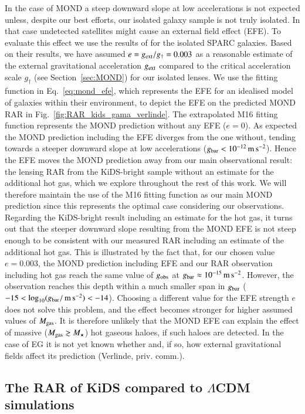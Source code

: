 \documentclass{aa}
\newcommand{\mpss}{\,{\rm m}\,{\rm s}^{-2} }
\newcommand{\un}[1]{_{\rm #1}}
\begin{document}
In the case of MOND a steep downward slope at low accelerations is not expected unless, despite our best efforts, our isolated galaxy sample is not truly isolated. In that case undetected satellites might cause an external field effect (EFE). To evaluate this effect we use the results of \cite{chae2020} for the isolated SPARC galaxies. Based on their results, we have assumed $e = g\un{ext}/g_\dagger = 0.003$ as a reasonable estimate of the external gravitational acceleration $g\un{ext}$ compared to the critical acceleration scale $g_\dagger$ (see Section~\ref{sec:MOND}) for our isolated lenses. We use the fitting function in Eq.~\ref{eq:mond_efe}, which represents the EFE for an idealised model of galaxies within their environment, to depict the EFE on the predicted MOND RAR in Fig.~\ref{fig:RAR_kids_gama_verlinde}. The extrapolated M16 fitting function represents the MOND prediction without any EFE ($e=0$). As expected the MOND prediction including the EFE diverges from the one without, tending towards a steeper downward slope at low accelerations ($g\un{bar} < 10^{-12} \mpss$). Hence the EFE moves the MOND prediction away from our main observational result: the lensing RAR from the KiDS-bright sample without an estimate for the additional hot gas, which we explore throughout the rest of this work. We will therefore maintain the use of the M16 fitting function as our main MOND prediction since this represents the optimal case considering our observations. Regarding the KiDS-bright result including an estimate for the hot gas, it turns out that the steeper downward slope resulting from the MOND EFE is not steep enough to be consistent with our measured RAR including an estimate of the additional hot gas. This is illustrated by the fact that, for our chosen value $e=0.003$, the MOND prediction including EFE and our RAR observation including hot gas reach the same value of $g\un{obs}$ at $g\un{bar}\approx10^{-15} \mpss$. However, the observation reaches this depth within a much smaller span in $g\un{bar}$ ($-15 < \log_{10}(g\un{bar}/ \mpss) < -14$). Choosing a different value for the EFE strength $e$ does not solve this problem, and the effect becomes stronger for higher assumed values of $M\un{gas}$. It is therefore unlikely that the MOND EFE can explain the effect of massive ($M\un{gas} \gtrsim M_\star$) hot gaseous haloes, if such haloes are detected. In the case of EG it is not yet known whether and, if so, how external gravitational fields affect its prediction (Verlinde, priv. comm.).

\subsection{The RAR of KiDS compared to $\Lambda$CDM simulations}
\label{sec:Results-Simulations}
\end{document}
